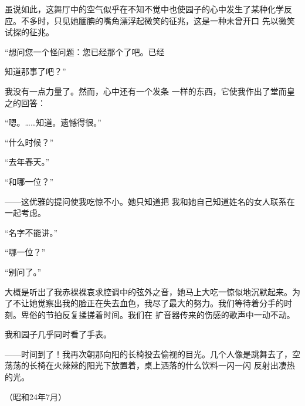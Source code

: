 \documentclass{article}
\begin{document}
虽说如此，这舞厅中的空气似乎在不知不觉中也使园子的心中发生了某种化学反应。不多时，只见她腼腆的嘴角漂浮起微笑的征兆，这是一种未曾开口
先以微笑试探的征兆。 

“想问您一个怪问题：您已经那个了吧。已经

\newpage
知道那事了吧？” 

我没有一点力量了。然而，心中还有一个发条
一样的东西，它使我作出了堂而皇之的回答： 


“嗯。……知道。遗憾得很。” 


“什么时候？” 


“去年春天。” 


“和哪一位？” 

——这优雅的提问使我吃惊不小。她只知道把
我和她自己知道姓名的女人联系在一起考虑。 


“名字不能讲。” 


“哪一位？” 


“别问了。” 

\newpage

大概是听出了我赤裸裸哀求腔调中的弦外之音，她马上大吃一惊似地沉默起来。为了不让她觉察出我的脸正在失去血色，我尽了最大的努力。我们等待着分手的时刻。卑俗的节拍反复揉搓着时间。我们在
扩音器传来的伤感的歌声中一动不动。 


我和园子几乎同时看了手表。 

——时间到了！我再次朝那向阳的长椅投去偷视的目光。几个人像是跳舞去了，空荡荡的长椅在火辣辣的阳光下放置着，桌上洒落的什么饮料一闪一闪
反射出凄热的光。 

（昭和24年7月）
\end{document}
